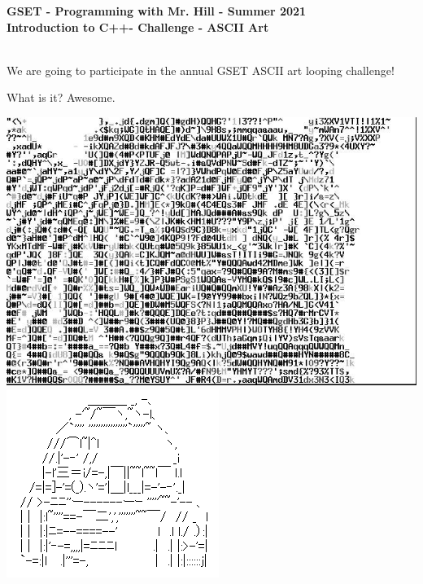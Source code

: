 \documentclass[12pt]{article}
\newcommand{\MNUM}{8} %
\newcommand{\MNAME}{Introduction to C++} %
\newcommand{\TNAME}{ASCII Art} %
\begin{document}
\thispagestyle{plain}

\begin{center}
   {\bf \large GSET - Programming with Mr. Hill - Summer 2021} \vspace{5mm}\\
   {\bf \Large \MNAME \hspc -  Challenge \hspc\MNUM\hspc - \TNAME}\vspace{3mm}\\
   
\end{center}


\begin{description}[labelindent=1cm]
	
	\item[\textbf{\underline{Overview:}}] \hfill \vspace{3mm}\\
	We are going to participate in the annual GSET ASCII art looping challenge! \vspace{5mm}\\
	
	\item[\textbf{\underline{ASCII art:}}] What is it? Awesome. \hfill \vspace{0mm}
	
	\includegraphics[scale=.3]{ascii_zebra_white}
	\includegraphics[scale=.7]{ascii_r2d2}
	

\end{description}
\end{document}
